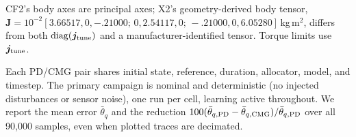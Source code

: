 \documentclass[letterpaper, 10 pt, conference]{ieeeconf}
\begin{document}

CF2's body axes are principal axes; X2's geometry-derived body tensor,
$\bm J=10^{-2}[3.66517,0,-.21000;\allowbreak\,0,2.54117,0;\allowbreak\,-.21000,0,6.05280]$\,kg\,m$^2$,
differs from both $\operatorname{diag}(\bm j_{\rm tune})$ and a
manufacturer-identified tensor. Torque limits use $\bm j_{\rm tune}$.

Each PD/CMG pair shares initial state, reference, duration, allocator, model, and timestep. The primary campaign is nominal and deterministic (no injected disturbances or sensor noise), one run per cell, learning active throughout. We report the mean error $\bar\theta_q$ and the reduction $100(\bar\theta_{q,\rm PD}-\bar\theta_{q,\rm CMG})/\bar\theta_{q,\rm PD}$ over all 90{,}000 samples, even when plotted traces are decimated.
\end{document}
